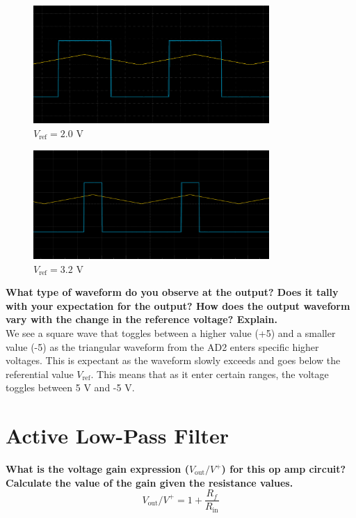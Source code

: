 \documentclass[a4paper,12pt,oneside, tikz]{book}
\begin{document}
\begin{figure}[H]
    \centering
    \includegraphics[width=0.8\textwidth]{./images/2_0.png}
    \caption{$V_\text{ref} = 2.0$ V}
    \label{fig:0_7}
\end{figure}

\begin{figure}[H]
    \centering
    \includegraphics[width=0.8\textwidth]{./images/3_2.png}
    \caption{$V_\text{ref} = 3.2$ V}
    \label{fig:0_7}
\end{figure}

\begin{tcolorbox}
\textbf{What type of waveform do you observe at the output? Does it tally with your expectation for the output? How does the output waveform vary with the change in the reference voltage? Explain. } \\
We see a square wave that toggles between a higher value (+5) and a smaller value (-5) as the triangular waveform from the AD2 enters specific higher voltages. This is expectant as the waveform slowly exceeds and goes below the referential value $V_\text{ref}$. This means that as it enter certain ranges, the voltage toggles between 5 V and -5 V.

\end{tcolorbox}

\chapter{Active Low-Pass Filter}
\begin{tcolorbox}
\textbf{What is the voltage gain expression ($V_\text{out}/V^+$) for this op amp circuit? Calculate the value of the gain given the resistance values. }\\
$$V_\text{out}/V^+ = 1 + \frac{R_f}{R_\text{in}}$$

\end{tcolorbox}
\end{document}
